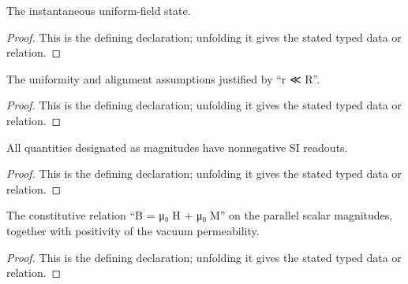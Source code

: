 \begin{definition}[ToroidalMagneticState]
  \label{decl:physics:IPhO_2026_3_A_1:ToroidalMagneticState}
  The instantaneous uniform-field state.
\end{definition}
\begin{proof}
  This is the defining declaration; unfolding it gives the stated typed data or relation.
\end{proof}

\begin{definition}[UsesUniformParallelFieldApproximation]
  \label{decl:physics:IPhO_2026_3_A_1:UsesUniformParallelFieldApproximation}
  The uniformity and alignment assumptions justified by “r ≪ R”.
\end{definition}
\begin{proof}
  This is the defining declaration; unfolding it gives the stated typed data or relation.
\end{proof}

\begin{definition}[HasNonnegativeMagnitudes]
  \label{decl:physics:IPhO_2026_3_A_1:HasNonnegativeMagnitudes}
  All quantities designated as magnitudes have nonnegative SI readouts.
\end{definition}
\begin{proof}
  This is the defining declaration; unfolding it gives the stated typed data or relation.
\end{proof}

\begin{definition}[SatisfiesParamagneticConstitutiveLaw]
  \label{decl:physics:IPhO_2026_3_A_1:SatisfiesParamagneticConstitutiveLaw}
  The constitutive relation “B = μ₀ H + μ₀ M” on the parallel scalar magnitudes, together with positivity of the vacuum permeability.
\end{definition}
\begin{proof}
  This is the defining declaration; unfolding it gives the stated typed data or relation.
\end{proof}

